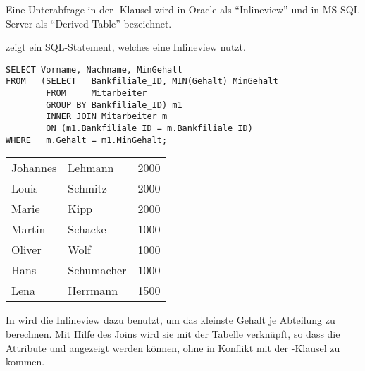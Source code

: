 \begin{merke}
    Eine Unterabfrage in der \FROM-Klausel wird in Oracle als \enquote{Inlineview} und in MS SQL Server als \enquote{Derived Table} bezeichnet.
\end{merke}
 zeigt ein SQL-Statement, welches eine Inlineview nutzt.
\begin{lstlisting}[language=oracle_sql,caption={Eine Inlineview},label=sql06_10]
SELECT Vorname, Nachname, MinGehalt
FROM   (SELECT   Bankfiliale_ID, MIN(Gehalt) MinGehalt
        FROM     Mitarbeiter
        GROUP BY Bankfiliale_ID) m1
        INNER JOIN Mitarbeiter m
        ON (m1.Bankfiliale_ID = m.Bankfiliale_ID)
WHERE   m.Gehalt = m1.MinGehalt;
      \end{lstlisting}
\begin{center}
    \begin{small}
        \tablehead{}
        \tabletail {
        }
        \begin{msoraclesql}
            \begin{supertabular}{llr}
                Johannes & Lehmann & 2000 \\
                Louis & Schmitz & 2000 \\
                Marie & Kipp & 2000 \\
                Martin & Schacke & 1000 \\
                Oliver & Wolf & 1000 \\
                Hans & Schumacher & 1000 \\
                Lena & Herrmann & 1500 \\
            \end{supertabular}
        \end{msoraclesql}
    \end{small}
\end{center}
In  wird die Inlineview dazu benutzt, um das kleinste Gehalt je Abteilung zu berechnen. Mit Hilfe des Joins wird sie mit der Tabelle  verknüpft, so dass die Attribute  und  angezeigt werden können, ohne in Konflikt mit der \GROUPBY-Klausel zu kommen.

